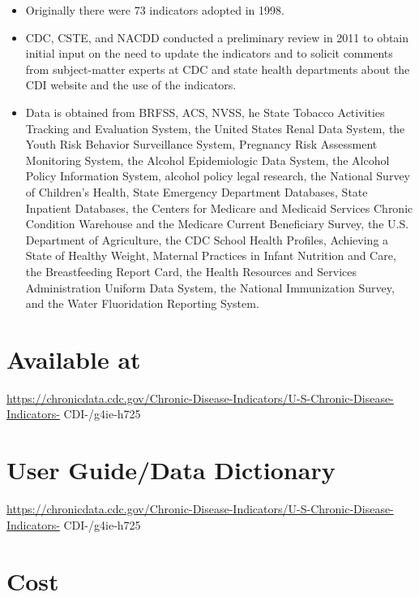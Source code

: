 \documentclass[
]{book}
\providecommand{\tightlist}{%
  \setlength{\itemsep}{0pt}\setlength{\parskip}{0pt}}
\begin{document}
\begin{itemize}
\tightlist
\item
  Originally there were 73 indicators adopted in 1998.
\item
  CDC, CSTE, and NACDD conducted a preliminary review in 2011 to obtain initial input on the need to update the indicators and to solicit comments from subject-matter experts at CDC and state health departments about the CDI website and the use of the indicators.
\item
  Data is obtained from BRFSS, ACS, NVSS, he State Tobacco Activities Tracking and Evaluation System, the United States Renal Data System, the Youth Risk Behavior Surveillance System, Pregnancy Risk Assessment Monitoring System, the Alcohol Epidemiologic Data System, the Alcohol Policy Information System, alcohol policy legal research, the National Survey of Children's Health, State Emergency Department Databases, State Inpatient Databases, the Centers for Medicare and Medicaid Services Chronic Condition Warehouse and the Medicare Current Beneficiary Survey, the U.S. Department of Agriculture, the CDC School Health Profiles, Achieving a State of Healthy Weight, Maternal Practices in Infant Nutrition and Care, the Breastfeeding Report Card, the Health Resources and Services Administration Uniform Data System, the National Immunization Survey, and the Water Fluoridation Reporting System.
\end{itemize}

\hypertarget{available-at-16}{%
\section{Available at}\label{available-at-16}}

\url{https://chronicdata.cdc.gov/Chronic-Disease-Indicators/U-S-Chronic-Disease-Indicators-} CDI-/g4ie-h725

\hypertarget{user-guidedata-dictionary-16}{%
\section{User Guide/Data Dictionary}\label{user-guidedata-dictionary-16}}

\url{https://chronicdata.cdc.gov/Chronic-Disease-Indicators/U-S-Chronic-Disease-Indicators-} CDI-/g4ie-h725

\hypertarget{cost-16}{%
\section{Cost}\label{cost-16}}
\end{document}
